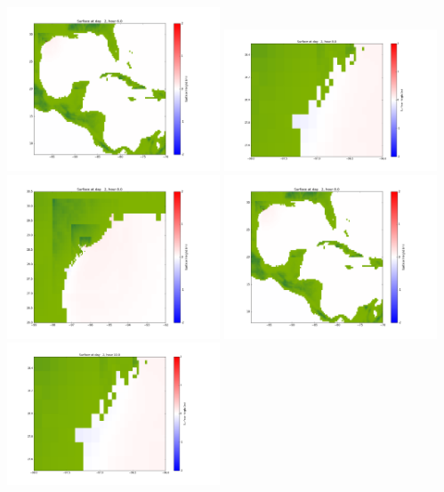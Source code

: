 \documentclass[11pt]{article}
\begin{document}
\vskip 10pt 
\includegraphics[width=0.475\textwidth]{frame0051fig1003.png}
\vskip 10pt 
\includegraphics[width=0.475\textwidth]{frame0052fig1001.png}
\includegraphics[width=0.475\textwidth]{frame0052fig1002.png}
\vskip 10pt 
\includegraphics[width=0.475\textwidth]{frame0052fig1003.png}
\vskip 10pt 
\includegraphics[width=0.475\textwidth]{frame0053fig1001.png}
\end{document}
